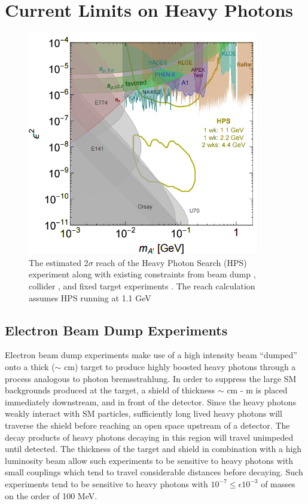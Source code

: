 \section{Current Limits on Heavy Photons}
\begin{figure}[ht]
    \centering
    \includegraphics[width=0.9\textwidth]{images/ap_current_limits.png}
    \caption{The estimated 2$\sigma$ reach of the Heavy Photon Search (HPS) 
             experiment along with existing constraints from beam dump  
             \cite{},
             collider \cite{}, 
             and fixed target experiments
             \cite{}.
         The reach calculation assumes HPS running at 1.1 GeV}
    \label{fig:ap_limits}
\end{figure}

\subsection{Electron Beam Dump Experiments}

Electron beam dump experiments make use of a high intensity beam ``dumped'' onto
a thick ($\sim$ cm) target to produce highly boosted heavy photons through a 
process analogous to photon bremsstrahlung.  In order to suppress the large
SM backgrounds produced at the target, a shield of thickness $\sim$ cm - m
is placed immediately downstream, and in front of the detector.  Since the 
heavy photons weakly interact with SM particles, sufficiently long lived 
heavy photons will traverse the shield before reaching an open space upstream
of a detector.  The decay products of heavy photons decaying in this region 
will travel unimpeded until detected.
The thickness of the target and shield in combination with a high luminosity
beam allow such experiments to be sensitive to heavy photons with small 
couplings which tend to travel considerable distances before decaying. Such 
experiments tend to be sensitive to heavy photons with 
$10^{-7} \le \epsilon 10^{-3}$  of masses on the order of 100 MeV. 

